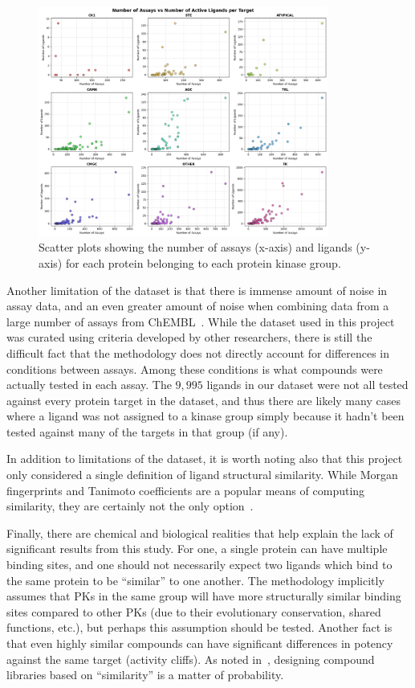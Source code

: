 \documentclass[11pt]{article}
\begin{document}
\begin{figure}[H]
    \centering
    \includegraphics[width=0.85\textwidth]{../figures/assay_vs_ligand.png}
    \caption{Scatter plots showing the number of assays (x-axis) and ligands (y-axis) for each protein belonging to each protein kinase group.}\label{fig:assay_vs_ligand_plot}
\end{figure}

Another limitation of the dataset is that there is immense amount of noise in assay data, and an even greater amount of noise when combining data from a large number of assays from ChEMBL~\cite{landrum_riniker_2024}. 
While the dataset used in this project was curated using criteria developed by other researchers, there is still the difficult fact that the methodology does not directly account for differences in conditions between assays. 
Among these conditions is what compounds were actually tested in each assay. 
The $9,995$ ligands in our dataset were not all tested against every protein target in the dataset, and thus there are likely many cases where a ligand was not assigned to a kinase group simply because it hadn't been tested against many of the targets in that group (if any). 

In addition to limitations of the dataset, it is worth noting also that this project only considered a single definition of ligand structural similarity. 
While Morgan fingerprints and Tanimoto coefficients are a popular means of computing similarity, they are certainly not the only option~\cite{maggiora_vogt_stumpfe_bajorath_2013,molsim_2024}.

Finally, there are chemical and biological realities that help explain the lack of significant results from this study. 
For one, a single protein can have multiple binding sites, and one should not necessarily expect two ligands which bind to the same protein to be ``similar'' to one another. 
The methodology implicitly assumes that PKs in the same group will have more structurally similar binding sites compared to other PKs (due to their evolutionary conservation, shared functions, etc.), but perhaps this assumption should be tested. 
Another fact is that even highly similar compounds can have significant differences in potency against the same target (activity cliffs). 
As noted in~\cite{martin_kofron_traphagen_2002}, designing compound libraries based on ``similarity'' is a matter of probability. 
\end{document}
